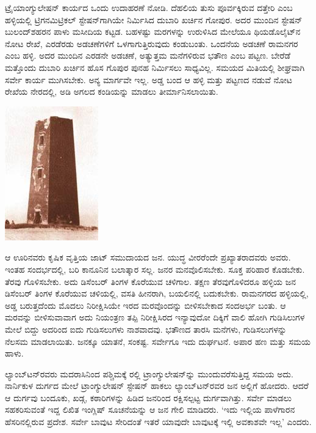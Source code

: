 ಟ್ರೈಯಾಂಗ್ಯುಲೇಷನ್​ ಕಾರ್ಯದ ಒಂದು ಉದಾಹರಣೆ ನೋಡಿ. ದೆಹಲಿಯ ತುಸು ಪೂರ್ವಕ್ಕಿರುವ ದತ್ತೇರಿ ಎಂಬ ಹಳ್ಳಿಯಲ್ಲಿ ಟ್ರಿಗನಮಿಟ್ರಿಕಲ್​ ಸ್ಟೇಷನ್​ಗಾಗಿಯೇ ನಿರ್ಮಿಸಿದ ದುಬಾರಿ ಖರ್ಚಿನ ಗೋಪುರ. ಅದರ ಮುಂದಿನ ಸ್ಟೇಷನ್​ ಬುಲಂದ್​ಶಹರನ ಪಾಳು ಮಸೀದಿಯ ಕಟ್ಟಡ. ಬಹಳಷ್ಟು ಮರಗಳನ್ನು ಉರುಳಿಸಿದ ಮೇಲೆಯೂ ಥಿಯಡೊಲೈಟ್​ನ ನೋಟ ರೇಖೆ, ಎರಡೆರಡು ಅಡಚಣೆಗಳಿಗೆ ಒಳಗಾಗುತ್ತಿರುವುದು ಕಂಡುಬಂತು. ಒಂದನೆಯ ಅಡಚಣೆ ರಾಮನಗರ ಎಂಬ ಹಳ್ಳಿ. ಅದರ ಮುಂದಿನ ಎರಡನೇ ಅಡಚಣೆ, ಅತ್ಯುತ್ತಮ ಮನೆಗಳಿರುವ ಭತೌಣ ಎಂಬ ಪಟ್ಟಣ. ಬೇರೆಡೆ ಮತ್ತೊಂದು ದುಬಾರಿ ಖರ್ಚಿನ ಹೊಸ ಗೊಪುರ ಪುನಹ ನಿರ್ಮಿಸಲು ಸಾಧ್ಯವಿಲ್ಲ. ಸಮಯದ ಮಿತಿಯಲ್ಲಿ ಶೀಘ್ರವಾಗಿ ಸರ್ವೇ ಕಾರ್ಯ ಮುಗಿಸಬೇಕು. ಅನ್ಯ ಮಾರ್ಗವೇ ಇಲ್ಲ. ಅಡ್ಡ ಬಂದ ಆ ಹಳ್ಳಿ ಮತ್ತು ಪಟ್ಟಣದ ನಡುವೆ ನೋಟ ರೇಖೆಯ ನೇರದಲ್ಲಿ,  ಅಡಿ ಅಗಲದ ಕಂಡಿಯನ್ನು ಮಾಡಲು ತೀರ್ಮಾನಿಸಲಾಯಿತು.

\begin{center}
\includegraphics[scale=0.6]{"images/image015.jpg"}
\end{center}

ಆ ಊರಿನವರು ಕೃಷಿಕ ವೃತ್ತಿಯ ಜಾಟ್​ ಸಮುದಾಯದ ಜನ. ಯುದ್ಧ ವೀರರೆಂದೇ ಪ್ರಖ್ಯಾತರಾದವರು ಅವರು. ಇಂತಹ ಸಂದರ್ಭದಲ್ಲಿ, ಬರಿ ಕಾನೂನಿನ ಬಲಾತ್ಕಾರ ಸಲ್ಲ. ಜನರ ಮನವೊಲಿಸಬೇಕು. ಸೂಕ್ತ ಪರಿಹಾರ ಕೊಡಬೇಕು. ತೆರವು ಗೊಳಿಸಬೇಕು. ಅದು ಡಿಸೆಂಬರ್​ ತಿಂಗಳ ಕೊರೆಯುವ ಚಳಿಗಾಲ. ತಕ್ಷಣ ತೆರವುಗೊಳಿದರೂ ಹಳ್ಳಿಯ ಜನ ಡಿಸೆಂಬರ್​ ತಿಂಗಳ ಕೊರೆಯುವ ಚಳಿಯಲ್ಲಿ, ವಸತಿ ಹೀನರಾಗಿ, ಬಯಲಿನಲ್ಲಿ ಬದುಕಬೇಕು. ರಾಮನಗರದ ಹಳ್ಳಿಯಲ್ಲಿ, ಅಡ್ಡ ಬರುತ್ತದೆಂದು ಮೊದಲು ನಿರೀಕ್ಷಿಸಿಯೇ ಇರದ ಮರವೊಂದನ್ನು ಬೀಳಿಸಬೇಕಾದ ಸಂದಅರ್ಭ ಬಂತು. ಆ ಮರವನ್ನು ಬೀಳಿಸುವಾವಾಗ ಅದು ನಿಯಂತ್ರಣ ತಪ್ಪಿ ನಿರೀಕ್ಷಿಸಿರದ ಇನ್ಯಾವುದೋ ದಿಕ್ಕಿಗೆ ವಾಲಿ ಹೋಗಿ ಗುಡಿಸಿಲುಗಳ ಮೇಲೆ ಬಿದ್ದು ಅದರಿಂದ ಐದು ಗುಡಿಸಲುಗಳು ನಾಶವಾದವು. ಭತೌಣದ  ತಾರಸಿ ಮನೆಗಳು,  ಗುಡಿಸಲುಗಳನ್ನು ನೆಲಸಮ ಮಾಡಲಾಯಿತು. ಜನಕ್ಕೂ ಯಾತನೆ, ಸಂಕಷ್ಟ. ಸರ್ವೇಗೂ ಇದು ದುರ್ಘಟನೆ. ಅಪಾರ ಹಣ ಮತ್ತು ಸಮಯ ಹಾಳು.

ಲ್ಯಾಂಬ್​ಟನ್​ರವರು ಮದರಾಸಿನಿಂದ ಪಶ್ಚಿಮಕ್ಕೆ ರಲ್ಲಿ ಟ್ರಾಂಗ್ಯುಲೇಷನ್​ನ್ನು ಮುಂದುವರೆಸುತ್ತಿದ್ದ ಸಮಯ ಅದು. ನಾರ್ನಿಕುಳ ದುರ್ಗದ ಮೇಲೆ ಟ್ರಾಂಗ್ಯುಲೇಷನ್​ ಸ್ಟೇಷನ್​ ಹಾಕಲು ಲ್ಯಾಂಬ್​ಟನ್​ರವರ ಜನ ಅಲ್ಲಿಗೆ ಹೋದರು. ಆದರೆ ಆ ದುರ್ಗವು ಬಂದೂಕು, ಖಡ್ಗ, ಕಠಾರಿಗಳನ್ನು ಹಿಡಿದ ಜನರಿಂದ ರಕ್ಷಿಸಲ್ಪಟ್ಟ ದುರ್ಗವಾಗಿತ್ತು. ಸರ್ವೇ ಮಾಡಲು ಸಹಕರಿಸುವಂತೆ ಇದ್ದ ಲಿಖಿತ ಇಂಗ್ಲಿಷ್​ ಸೂಚನೆಯನ್ನು ಆ ಜನ ಗೇಲಿ ಮಾಡಿದರು. ‘ಇದು ಇಲ್ಲಿಯ ಪಾಳೆಗಾರನ ಹೆಸರಿನಲ್ಲಿರುವ ಪ್ರದೇಶ. ಸರ್ವೇ ಬಾವುಟ ಸೇರಿದಂತೆ ಇತರೆ ಯಾವುದೇ ಬಾವುಟಕ್ಕೆ ಇಲ್ಲಿ ಅವಕಾಶವೇ ಇಲ್ಲ’ ಎಂದರು.

